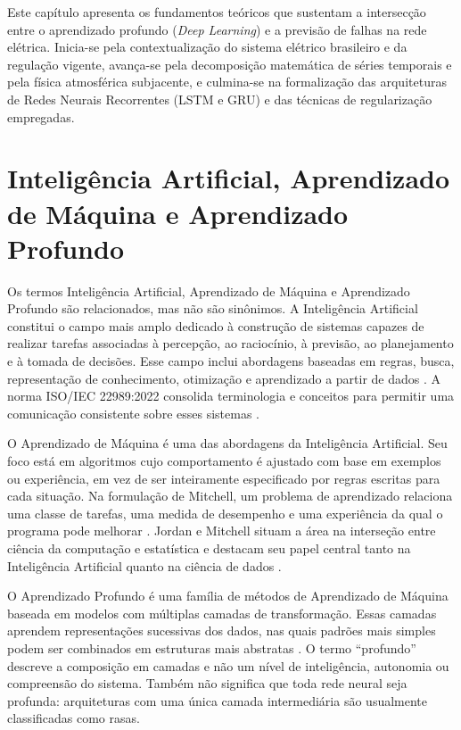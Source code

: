 Este capítulo apresenta os fundamentos teóricos que sustentam a intersecção entre o aprendizado profundo (\textit{Deep Learning}) e a previsão de falhas na rede elétrica. Inicia-se pela contextualização do sistema elétrico brasileiro e da regulação vigente, avança-se pela decomposição matemática de séries temporais e pela física atmosférica subjacente, e culmina-se na formalização das arquiteturas de Redes Neurais Recorrentes (LSTM e GRU) e das técnicas de regularização empregadas.

\section{Inteligência Artificial, Aprendizado de Máquina e Aprendizado Profundo}\label{sec:ia_ml_dl}

Os termos Inteligência Artificial, Aprendizado de Máquina e Aprendizado Profundo são relacionados, mas não são sinônimos. A Inteligência Artificial constitui o campo mais amplo dedicado à construção de sistemas capazes de realizar tarefas associadas à percepção, ao raciocínio, à previsão, ao planejamento e à tomada de decisões. Esse campo inclui abordagens baseadas em regras, busca, representação de conhecimento, otimização e aprendizado a partir de dados \cite{russell2021artificial}. A norma ISO/IEC 22989:2022 consolida terminologia e conceitos para permitir uma comunicação consistente sobre esses sistemas \cite{isoiec22989}.

O Aprendizado de Máquina é uma das abordagens da Inteligência Artificial. Seu foco está em algoritmos cujo comportamento é ajustado com base em exemplos ou experiência, em vez de ser inteiramente especificado por regras escritas para cada situação. Na formulação de Mitchell, um problema de aprendizado relaciona uma classe de tarefas, uma medida de desempenho e uma experiência da qual o programa pode melhorar \cite{mitchell1997machine}. Jordan e Mitchell situam a área na interseção entre ciência da computação e estatística e destacam seu papel central tanto na Inteligência Artificial quanto na ciência de dados \cite{jordan2015machine}.

O Aprendizado Profundo é uma família de métodos de Aprendizado de Máquina baseada em modelos com múltiplas camadas de transformação. Essas camadas aprendem representações sucessivas dos dados, nas quais padrões mais simples podem ser combinados em estruturas mais abstratas \cite{goodfellow2016deep,lecun2015deep}. O termo ``profundo'' descreve a composição em camadas e não um nível de inteligência, autonomia ou compreensão do sistema. Também não significa que toda rede neural seja profunda: arquiteturas com uma única camada intermediária são usualmente classificadas como rasas.

